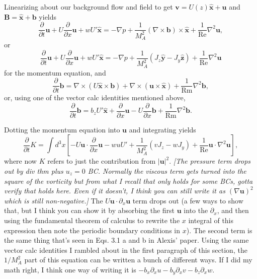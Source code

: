 \documentclass[aps,pop,preprint]{revtex4}
\newcommand{\Rm}{\mathrm{Rm}}
\renewcommand{\Re}{\mathrm{Re}}
\begin{document}
Linearizing about our background flow and field to get $\mathbf{v} = U(z) \hat{\mathbf{x}} + \mathbf{u}$ and $\mathbf{B} = \hat{\mathbf{x}} + \mathbf{b}$ yields
\begin{equation}
	\frac{\partial}{\partial t} \mathbf{u} + U \frac{\partial}{\partial x} \mathbf{u} + w U' \hat{\mathbf{x}} = -\nabla p + \frac{1}{M_A^2} \left( \nabla \times \mathbf{b} \right) \times \hat{\mathbf{x}} + \frac{1}{\Re} \nabla^2 \mathbf{u},
\end{equation}
or
\begin{equation}
	\frac{\partial}{\partial t} \mathbf{u} + U \frac{\partial}{\partial x} \mathbf{u} + w U' \hat{\mathbf{x}} = -\nabla p + \frac{1}{M_A^2} \left( J_z \hat{\mathbf{y}} - J_y \hat{\mathbf{z}} \right) + \frac{1}{\Re} \nabla^2 \mathbf{u}
\end{equation}
for the momentum equation, and 
\begin{equation}
	\frac{\partial}{\partial t} \mathbf{b} = \nabla \times (U \hat{\mathbf{x}} \times \mathbf{b}) + \nabla \times (\mathbf{u} \times \hat{\mathbf{x}}) + \frac{1}{\Rm} \nabla^2 \mathbf{b},
\end{equation}
or, using one of the vector calc identities mentioned above,
\begin{equation}
	\frac{\partial}{\partial t} \mathbf{b} = b_z U' \hat{\mathbf{x}} + \frac{\partial}{\partial x} \mathbf{u} - U \frac{\partial}{\partial x} \mathbf{b} + \frac{1}{\Rm} \nabla^2 \mathbf{b}.
\end{equation}

Dotting the momentum equation into $\mathbf{u}$ and integrating yields
\begin{equation}
    \frac{\partial}{\partial t} K = \int d^3x \left[ -U \mathbf{u} \cdot \frac{\partial}{\partial x} \mathbf{u} - wuU' + \frac{1}{M_A^2} ( vJ_z - wJ_y ) + \frac{1}{\mathrm{Re}} \mathbf{u} \cdot \nabla^2 \mathbf{u} \right],
\end{equation}
where now $K$ refers to just the contribution from $|\mathbf{u}|^2$. 
\textit{[The pressure term drops out by div thm plus $u_z=0$ BC. Normally the viscous term gets turned into the square of the vorticity but from what I recall that only holds for some BCs, gotta verify that holds here. Even if it doesn't, I think you can still write it as $(\nabla \mathbf{u})^2$ which is still non-negative.]} 
The $U \mathbf{u} \cdot \partial_x \mathbf{u}$ term drops out (a few ways to show that, but I think you can show it by absorbing the first $\mathbf{u}$ into the $\partial_x$, and then using the fundamental theorem of calculus to rewrite the $x$ integral of this expression then note the periodic boundary conditions in $x$). 
The second term is the same thing that's seen in Eqs. 3.1 a and b in Alexis' paper.
Using the same vector calc identities I rambled about in the first paragraph of this section, the $1/M_A^2$ part of this equation can be written a bunch of different ways. 
If I did my math right, I think one way of writing it is $-b_x \partial_x u - b_y \partial_x v - b_z \partial_x w$.
\end{document}
